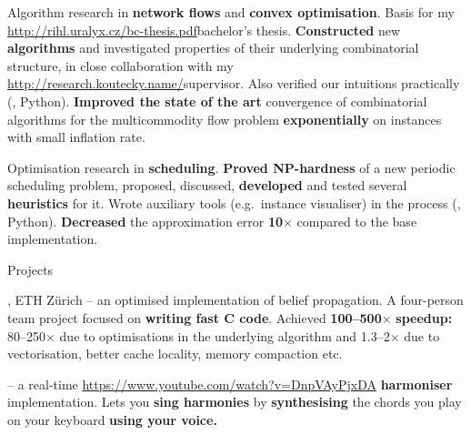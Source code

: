 %
\: Algorithm research in {\bf network flows} and {\bf convex optimisation}. Basis for my \url{http://rihl.uralyx.cz/bc-thesis.pdf}{bachelor's thesis}.
\: {\bf Constructed} new {\bf algorithms} and investigated properties of their underlying combinatorial structure, in close collaboration with my
\url{http://research.koutecky.name/}{supervisor}. Also verified our intuitions practically (\Cpp, Python).
\: {\bf Improved the state of the art} convergence of combinatorial
algorithms for the multicommodity flow problem {\bf exponentially}
on instances with small inflation rate.
%
%
\endlist

%
%
\: Optimisation research in {\bf scheduling}.
\: {\bf Proved NP-hardness} of a new periodic scheduling problem, proposed, discussed, {\bf
developed} and tested several {\bf heuristics} for it. Wrote auxiliary tools (e.g.~instance visualiser) in the process (\Cpp, Python).
\:
{\bf Decreased} the approximation error {\bf 10$\times$} compared to the base implementation.

\endlist

\sekce Projects

, {\I ETH Zürich} – an optimised implementation of belief propagation.
\: A four-person team project focused on {\bf writing fast C code}.
\: Achieved {\bf 100–500}$\times$ {\bf speedup:} 80–250$\times$ due to optimisations in the underlying algorithm and 1.3–2$\times$ due to vectorisation, better cache locality, memory compaction etc.
\endlist

 –
%
a real-time \Cpp{} \url{https://www.youtube.com/watch?v=DnpVAyPjxDA}{{\bf
harmoniser}} implementation.
\: Lets you {\bf sing harmonies} by {\bf synthesising} the chords you play on your keyboard {\bf using your voice.}

